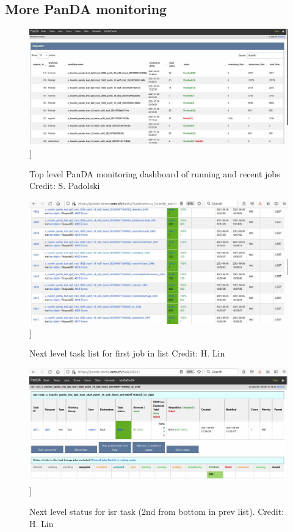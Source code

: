 \documentclass[DM,authoryear,toc]{lsstdoc}
\begin{document}
\subsection{More PanDA monitoring}

\begin{enumerate}

\begin{figure}
\includegraphics[width=\textwidth]{pandadash0.jpg}]
\caption{Top level PanDA monitoring dashboard of running and recent jobs
Credit: S. Padolski}
\label{pandadash0}
\end{figure}

\begin{figure}
\includegraphics[width=\textwidth]{tasks1.jpg}]
\caption{Next level task list for first job in list
Credit: H. Lin}
\label{tasks1}
\end{figure}

\begin{figure}
\includegraphics[width=\textwidth]{tasks4.jpg}]
\caption{Next level status for isr task (2nd from bottom in prev list).
Credit: H. Lin}
\label{tasks4}
\end{figure}


\end{enumerate}
\end{document}
